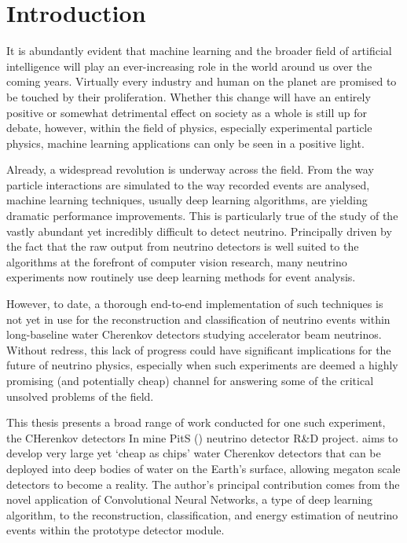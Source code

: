 \chapter{Introduction} %
\label{chap:introduction} %
\setcounter{page}{15}  %

It is abundantly evident that machine learning and the broader field of artificial intelligence
will play an ever-increasing role in the world around us over the coming years. Virtually every
industry and human on the planet are promised to be touched by their proliferation. Whether this
change will have an entirely positive or somewhat detrimental effect on society as a whole is
still up for debate, however, within the field of physics, especially experimental particle
physics, machine learning applications can only be seen in a positive light.

Already, a widespread revolution is underway across the field. From the way particle interactions
are simulated to the way recorded events are analysed, machine learning techniques, usually deep
learning algorithms, are yielding dramatic performance improvements. This is particularly true of
the study of the vastly abundant yet incredibly difficult to detect neutrino. Principally driven
by the fact that the raw output from neutrino detectors is well suited to the algorithms at the
forefront of computer vision research, many neutrino experiments now routinely use deep learning
methods for event analysis.

However, to date, a thorough end-to-end implementation of such techniques is not yet in use for
the reconstruction and classification of neutrino events within long-baseline water Cherenkov
detectors studying accelerator beam neutrinos. Without redress, this lack of progress could have
significant implications for the future of neutrino physics, especially when such experiments are
deemed a highly promising (and potentially cheap) channel for answering some of the critical
unsolved problems of the field.

This thesis presents a broad range of work conducted for one such experiment, the CHerenkov
detectors In mine PitS (\chips) neutrino detector R\&D project. \chips aims to develop very large
yet `cheap as chips' water Cherenkov detectors that can be deployed into deep bodies of water on
the Earth's surface, allowing megaton scale detectors to become a reality. The author's principal
contribution comes from the novel application of Convolutional Neural Networks, a type of deep
learning algorithm, to the reconstruction, classification, and energy estimation of neutrino
events within the \chipsfive prototype detector module.


